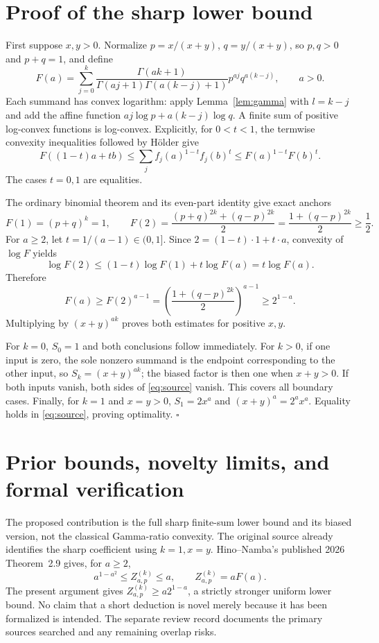 \documentclass[11pt]{article}
\begin{document}
\section{Proof of the sharp lower bound}
First suppose $x,y>0$. Normalize $p=x/(x+y)$, $q=y/(x+y)$, so $p,q>0$ and
$p+q=1$, and define
\[
 F(a)=\sum_{j=0}^k
 \frac{\Gamma(ak+1)}{\Gamma(aj+1)\Gamma(a(k-j)+1)}
 p^{aj}q^{a(k-j)},\qquad a>0.
\]
Each summand has convex logarithm: apply Lemma~\ref{lem:gamma} with
$l=k-j$ and add the affine function $aj\log p+a(k-j)\log q$.
A finite sum of positive log-convex functions is log-convex. Explicitly,
for $0<t<1$, the termwise convexity inequalities followed by H\"older give
\[
 F((1-t)a+tb)
 \leq\sum_j f_j(a)^{1-t}f_j(b)^t
 \leq F(a)^{1-t}F(b)^t.
\]
The cases $t=0,1$ are equalities.

The ordinary binomial theorem and its even-part identity give exact anchors
\[
 F(1)=(p+q)^k=1,\qquad
 F(2)=\frac{(p+q)^{2k}+(q-p)^{2k}}2
     =\frac{1+(q-p)^{2k}}2\geq\frac12.
\]
For $a\geq2$, let $t=1/(a-1)\in(0,1]$. Since
$2=(1-t)\cdot1+t\cdot a$, convexity of $\log F$ yields
\[
 \log F(2)\leq(1-t)\log F(1)+t\log F(a)=t\log F(a).
\]
Therefore
\[
 F(a)\geq F(2)^{a-1}
       =\left(\frac{1+(q-p)^{2k}}2\right)^{a-1}
       \geq2^{1-a}.
\]
Multiplying by $(x+y)^{ak}$ proves both estimates for positive $x,y$.

For $k=0$, $S_0=1$ and both conclusions follow immediately.
For $k>0$, if one input is zero, the sole nonzero summand is the endpoint
corresponding to the other input, so $S_k=(x+y)^{ak}$; the biased factor
is then one when $x+y>0$. If both inputs vanish, both sides of
\eqref{eq:source} vanish. This covers all boundary cases.
Finally, for $k=1$ and $x=y>0$, $S_1=2x^a$ and
$(x+y)^a=2^ax^a$. Equality holds in \eqref{eq:source}, proving optimality.
\hfill$\square$

\section{Prior bounds, novelty limits, and formal verification}
The proposed contribution is the full sharp finite-sum lower bound and its
biased version, not the classical Gamma-ratio convexity. The original
source already identifies the sharp coefficient using $k=1,x=y$.
Hino--Namba's published 2026 Theorem~2.9 \cite{HN} gives, for $a\geq2$,
\[
 a^{1-a^2}\leq Z_{a,p}^{(k)}\leq a,\qquad
 Z_{a,p}^{(k)}=aF(a).
\]
The present argument gives $Z_{a,p}^{(k)}\geq a2^{1-a}$, a strictly
stronger uniform lower bound. No claim that a short deduction is novel
merely because it has been formalized is intended. The separate review
record documents the primary sources searched and any remaining overlap
risks.
\end{document}
